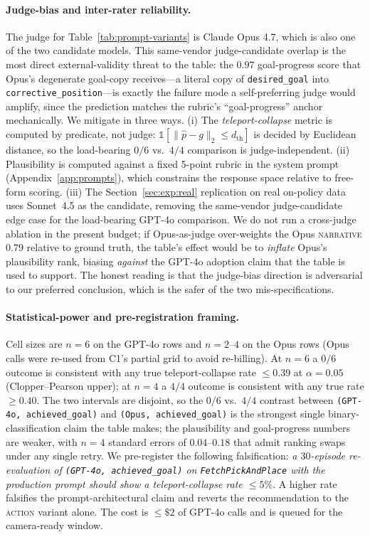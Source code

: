 \documentclass{article}
\begin{document}
\paragraph{Judge-bias and inter-rater reliability.}
The judge for Table~\ref{tab:prompt-variants} is Claude Opus 4.7, which is
also one of the two candidate models. This same-vendor judge-candidate
overlap is the most direct external-validity threat to the table: the
$0.97$ goal-progress score that Opus's degenerate goal-copy receives---a
literal copy of \texttt{desired\_goal} into \texttt{corrective\_position}---is
exactly the failure mode a self-preferring judge would amplify, since the
prediction matches the rubric's ``goal-progress'' anchor mechanically. We mitigate
in three ways. (i) The \emph{teleport-collapse} metric is computed by
predicate, not judge: $\mathbb{1}[\|\hat p\!-\!g\|_2\!\le\!d_{\text{th}}]$
is decided by Euclidean distance, so the load-bearing $0/6$ vs.\ $4/4$
comparison is judge-independent. (ii) Plausibility is computed against a
fixed 5-point rubric in the system prompt (Appendix~\ref{app:prompts}),
which constrains the response space relative to free-form scoring. (iii)
The Section~\ref{sec:exp:real} replication on real on-policy data uses
Sonnet~4.5 as the candidate, removing the same-vendor judge-candidate edge
case for the load-bearing GPT-4o comparison. We do not run a cross-judge
ablation in the present budget; if Opus-as-judge over-weights the Opus
\textsc{narrative} $0.79$ relative to ground truth, the table's effect
would be to \emph{inflate} Opus's plausibility rank, biasing
\emph{against} the GPT-4o adoption claim that the table is used to
support. The honest reading is that the judge-bias direction is
adversarial to our preferred conclusion, which is the safer of the two
mis-specifications.

\paragraph{Statistical-power and pre-registration framing.}
Cell sizes are $n\!=\!6$ on the GPT-4o rows and $n\!=\!2$--$4$ on the Opus
rows (Opus calls were re-used from C1's partial grid to avoid
re-billing). At $n\!=\!6$ a $0/6$ outcome is consistent with any true
teleport-collapse rate $\le\!0.39$ at $\alpha\!=\!0.05$ (Clopper--Pearson
upper); at $n\!=\!4$ a $4/4$ outcome is consistent with any true rate
$\ge\!0.40$. The two intervals are disjoint, so the $0/6$ vs.\ $4/4$
contrast between \texttt{(GPT-4o, achieved\_goal)} and
\texttt{(Opus, achieved\_goal)} is the strongest single
binary-classification claim the table makes; the plausibility and
goal-progress numbers are weaker, with $n\!=\!4$ standard errors of
$0.04$--$0.18$ that admit ranking swaps under any single retry. We
pre-register the following falsification: \emph{a $30$-episode
re-evaluation of \texttt{(GPT-4o, achieved\_goal)} on
\texttt{FetchPickAndPlace} with the production prompt should show a
teleport-collapse rate $\le 5\%$}. A higher rate falsifies the
prompt-architectural claim and reverts the recommendation to the
\textsc{action} variant alone. The cost is $\le\!\$2$ of GPT-4o calls and
is queued for the camera-ready window.
\end{document}
